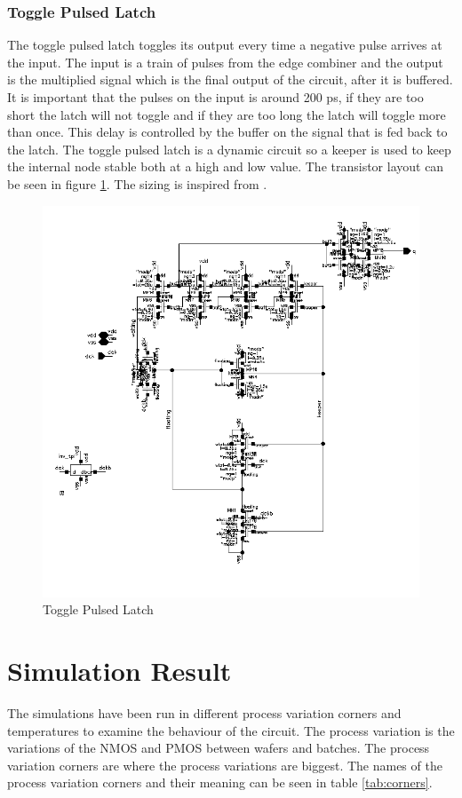 \documentclass[a4paper,12pt]{article} \usepackage{graphicx}
\begin{document}
\subsubsection{Toggle Pulsed Latch}
The toggle pulsed latch toggles its output every time a negative pulse arrives
at the input. The input is a train of pulses from the edge combiner and the
output is the multiplied signal which is the final output of the circuit, after
it is buffered. It is important that the pulses on the input is around 200 ps,
if they are too short the latch will not toggle and if they are too long the
latch will toggle more than once. This delay is controlled by the buffer on the
signal that is fed back to the latch. The toggle pulsed latch is a dynamic
circuit so a keeper is used to keep the internal node stable both at a high and
low value.
The transistor layout can be seen in figure \ref{fig:tpl}. The
sizing is inspired from \cite{dll_report}. 
\begin{figure}[p]
        \centering
        \includegraphics[width=\textwidth]{../Bilder/tpl_trans.png}
        \caption{Toggle Pulsed Latch}
        \label{fig:tpl}
\end{figure}

\clearpage
\section{Simulation Result}
The simulations have been run in different process variation corners and
temperatures to examine the behaviour of the circuit. The process variation is
the variations of the NMOS and PMOS between wafers and batches. 
The process variation corners are where the process variations are biggest.
The names of the process variation corners and their meaning can be seen in
table \ref{tab:corners}.
\end{document}
